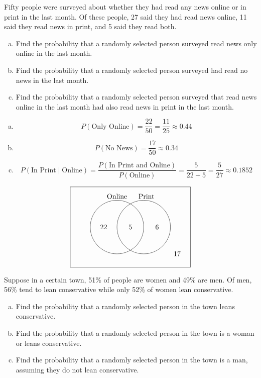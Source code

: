 \documentclass[12pt,letterpaper]{exam}
\begin{document}
\begin{questions}
\newpage
\question[10] Fifty people were surveyed about whether they had read any news online or in print in the last month. Of these people, 27 said they had read news online, 11 said they read news in print, and 5 said they read both. 
	\begin{enumerate}[(a)]
	\item Find the probability that a randomly selected person surveyed read news only online in the last month. 
	\item Find the probability that a randomly selected person surveyed had read no news in the last month. 
	\item Find the probability that a randomly selected person surveyed that read news online in the last month had also read news in print in the last month. 
	\end{enumerate} \pspace

\sol 
\begin{enumerate}[(a)]
\item 
	\[
	P(\text{Only Online})= \dfrac{22}{50}= \dfrac{11}{25} \approx 0.44
	\] \pspace

\item 
	\[
	P(\text{No News})= \dfrac{17}{50} \approx 0.34
	\] \pspace

\item 
	\[
	P(\text{In Print} \;|\; \text{Online})= \dfrac{P(\text{In Print and Online})}{P(\text{Online})}= \dfrac{5}{22 + 5}= \dfrac{5}{27} \approx 0.1852
	\]
\end{enumerate} \vfill

	\[
	\begin{tikzpicture}[scale=0.67]
	\draw (0,0) rectangle (9,6);
	\draw (3.5,3) circle (2);
	\draw (5.5,3) circle (2);
	
	\node at (3.5,5.3) {Online};
	\node at (5.7,5.3) {Print}; 
	
	\node at (2.5,3) {22};
	\node at (4.5,3) {5};
	\node at (6.5,3) {6};
	\node at (8,1) {17};
	\end{tikzpicture}
	\]



\newpage
\question[10] Suppose in a certain town, 51\% of people are women and 49\% are men. Of men, 56\% tend to lean conservative while only 52\% of women lean conservative. 
	\begin{enumerate}[(a)]
	\item Find the probability that a randomly selected person in the town leans conservative. 
	\item Find the probability that a randomly selected person in the town is a woman or leans conservative. 
	\item Find the probability that a randomly selected person in the town is a man, assuming they do not lean conservative. 
	\end{enumerate} \pspace


\end{questions}
\end{document}
